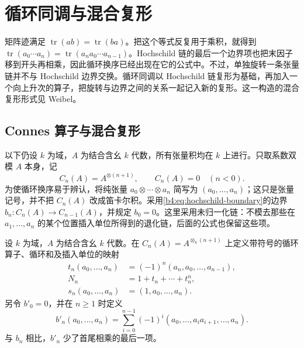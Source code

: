 
\section{循环同调与混合复形}
\label{b4:sec:1305}

矩阵迹满足 \(\operatorname{tr}(ab)=\operatorname{tr}(ba)\)。把这个等式反复用于乘积，就得到 \(\operatorname{tr}(a_0\cdots a_n)=\operatorname{tr}(a_n a_0\cdots a_{n-1})\)。Hochschild 链的最后一个边界项也把末因子移到开头再相乘，因此循环换序已经出现在它的公式中。不过，单独旋转一条张量链并不与 Hochschild 边界交换。循环同调以 Hochschild 链复形为基础，再加入一个向上升次的算子，把旋转与边界之间的关系一起记入新的复形。这一构造的混合复形形式见 Weibel\cite[Section 9.8, pp. 344--348]{Weibel1994HomologicalAlgebra}。

\subsection{Connes 算子与混合复形}
\label{b4:subsec:1305:01}

以下仍设 \(k\) 为域，\(A\) 为结合含幺 \(k\) 代数，所有张量积均在 \(k\) 上进行。只取系数双模 \(A\) 本身，记
\[
	C_n(A)=A^{\otimes(n+1)},\qquad C_n(A)=0\quad(n<0).
\]
为使循环换序易于辨认，将纯张量 \(a_0\otimes\cdots\otimes a_n\) 简写为 \((a_0,\ldots,a_n)\)；这只是张量记号，并不把 \(C_n(A)\) 改成笛卡尔积。采用\eqref{b4:eq:hochschild-boundary}的边界 \(b_n:C_n(A)\to C_{n-1}(A)\)，并规定 \(b_0=0\)。这里采用未归一化链：不模去那些在 \(a_1,\ldots,a_n\) 的某个位置插入单位所得到的退化链，后面的公式也保留这些项。

\begin{definition}\label{b4:def:cyclic-chain-operators}
	设 \(k\) 为域，\(A\) 为结合含幺 \(k\) 代数。在 \(C_n(A)=A^{\otimes_k(n+1)}\) 上定义带符号的循环算子、循环和及插入单位的映射
	\[
		\begin{aligned}
			t_n(a_0,\ldots,a_n)&=(-1)^n(a_n,a_0,\ldots,a_{n-1}),\\
			N_n&=1+t_n+\cdots+t_n^n,\\
			s_n(a_0,\ldots,a_n)&=(1,a_0,\ldots,a_n).
		\end{aligned}
	\]
	另令 \(b'_0=0\)，并在 \(n\ge1\) 时定义
	\[
		b'_n(a_0,\ldots,a_n)=\sum_{i=0}^{n-1}(-1)^i(a_0,\ldots,a_i a_{i+1},\ldots,a_n).
	\]
	与 \(b_n\) 相比，\(b'_n\) 少了首尾相乘的最后一项。
\end{definition}

